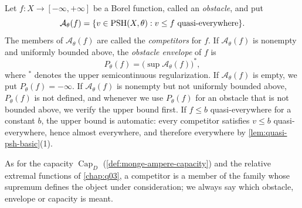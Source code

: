 \begin{definition}\label{def:global-obstacle-envelope}
Let $f\colon X\to[-\infty,+\infty]$ be a Borel function, called an \emph{obstacle}, and put
\[
 \mathcal A_\theta(f)=\{v\in\mathrm{PSH}(X,\theta):v\leq f
                                     \text{ quasi-everywhere}\}.
\]
The members of $\mathcal A_\theta(f)$ are called the \emph{competitors} for $f$. If $\mathcal A_\theta(f)$ is nonempty and uniformly bounded above, the \emph{obstacle envelope} of $f$ is
\[
 P_\theta(f)=\bigl(\sup\mathcal A_\theta(f)\bigr)^*,
\]
where ${}^*$ denotes the upper semicontinuous regularization. If $\mathcal A_\theta(f)$ is empty, we put $P_\theta(f)=-\infty$. If $\mathcal A_\theta(f)$ is nonempty but not uniformly bounded above, $P_\theta(f)$ is not defined, and whenever we use $P_\theta(f)$ for an obstacle that is not bounded above, we verify the upper bound first. If $f\leq b$ quasi-everywhere for a constant $b$, the upper bound is automatic: every competitor satisfies $v\leq b$ quasi-everywhere, hence almost everywhere, and therefore everywhere by \cref{lem:quasi-psh-basic}(1).
\end{definition}
As for the capacity $\operatorname{Cap}_D$ (\cref{def:monge-ampere-capacity}) and the relative extremal functions of \cref{chap:q03}, a competitor is a member of the family whose supremum defines the object under consideration; we always say which obstacle, envelope or capacity is meant.


